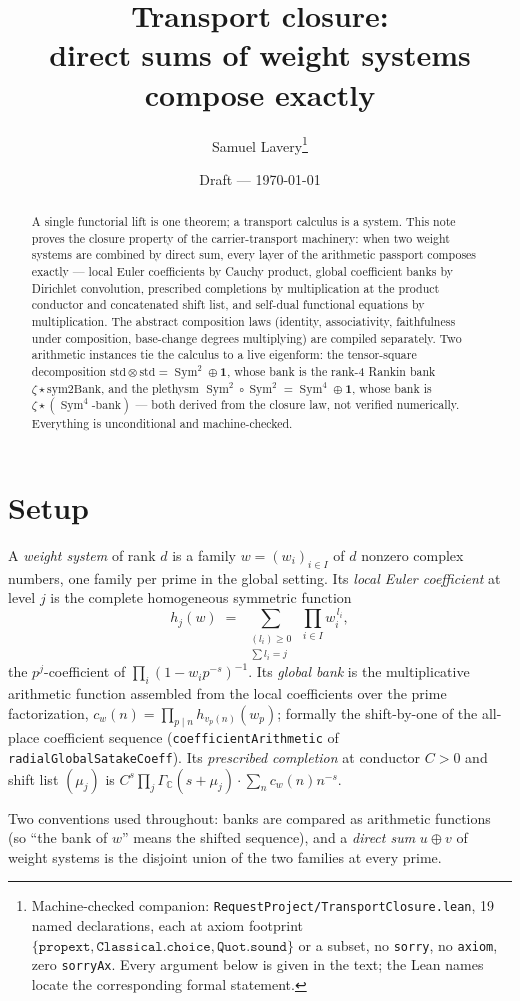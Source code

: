 \documentclass[11pt]{article}
\title{Transport closure:\\ direct sums of weight systems compose exactly}
\author{Samuel Lavery\thanks{Machine-checked companion:
\texttt{RequestProject/TransportClosure.lean}, 19 named declarations, each at axiom footprint
$\{\texttt{propext},\texttt{Classical.choice},\texttt{Quot.sound}\}$ or a subset, no
\texttt{sorry}, no \texttt{axiom}, zero \texttt{sorryAx}.  Every argument below is given in the
text; the Lean names locate the corresponding formal statement.}}
\date{Draft --- \today}
\newcommand{\Sym}{\operatorname{Sym}}
\newcommand{\Gm}{\Gamma_{\mathbb C}}
\begin{document}
\maketitle

\begin{abstract}
A single functorial lift is one theorem; a transport calculus is a system.  This note proves
the closure property of the carrier-transport machinery: when two weight systems are combined
by direct sum, every layer of the arithmetic passport composes exactly --- local Euler
coefficients by Cauchy product, global coefficient banks by Dirichlet convolution, prescribed
completions by multiplication at the product conductor and concatenated shift list, and
self-dual functional equations by multiplication.  The abstract composition laws (identity,
associativity, faithfulness under composition, base-change degrees multiplying) are compiled
separately.  Two arithmetic instances tie the calculus to a live eigenform: the tensor-square
decomposition $\mathrm{std}\otimes\mathrm{std}=\Sym^2\oplus\mathbf 1$, whose bank is the rank-4
Rankin bank $\zeta\star\mathrm{sym2Bank}$, and the plethysm
$\Sym^2\!\circ\Sym^2=\Sym^4\oplus\mathbf 1$, whose bank is $\zeta\star(\Sym^4\text{-bank})$ ---
both derived from the closure law, not verified numerically.  Everything is unconditional and
machine-checked.
\end{abstract}

\section{Setup}

A \emph{weight system} of rank $d$ is a family $w=(w_i)_{i\in I}$ of $d$ nonzero complex
numbers, one family per prime in the global setting.  Its \emph{local Euler coefficient} at
level $j$ is the complete homogeneous symmetric function
\[
  h_j(w)\;=\;\sum_{\substack{(l_i)\ge0\\ \sum l_i=j}}\ \prod_{i\in I}w_i^{\,l_i},
\]
the $p^j$-coefficient of $\prod_i(1-w_ip^{-s})^{-1}$.  Its \emph{global bank} is the
multiplicative arithmetic function assembled from the local coefficients over the prime
factorization,
$c_w(n)=\prod_{p\mid n}h_{v_p(n)}(w_p)$; formally the shift-by-one of the all-place
coefficient sequence (\texttt{coefficientArithmetic} of
\texttt{radialGlobalSatakeCoeff}).  Its \emph{prescribed completion} at conductor $C>0$ and
shift list $(\mu_j)$ is $C^s\prod_j\Gm(s+\mu_j)\cdot\sum_n c_w(n)n^{-s}$.

Two conventions used throughout: banks are compared as arithmetic functions (so ``the bank of
$w$'' means the shifted sequence), and a \emph{direct sum} $u\oplus v$ of weight systems is the
disjoint union of the two families at every prime.
\end{document}
